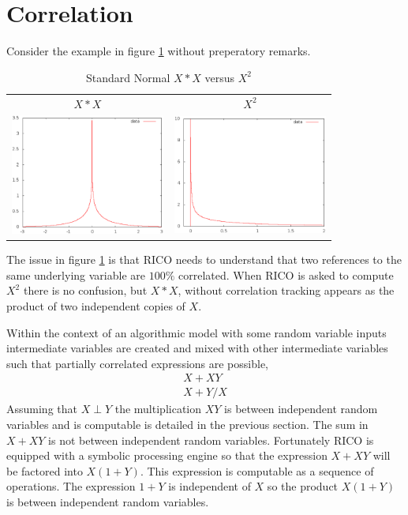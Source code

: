 \section{Correlation}
Consider the example in figure \ref{fig:Product_Power} without preperatory remarks.
\begin{table}
\begin{center}
\begin{tabular}{cc}
$X*X$ & $X^2$\\
\includegraphics[width=2in]{Images/N01xN01.eps} &
\includegraphics[width=2in]{Images/N01xx2.eps} \\
\end{tabular}
\end{center}
\caption[Standard Normal $X*X$ versus $X^2$]
        {Standard Normal $X*X$ versus $X^2$}
\label{fig:Product_Power}
\end{table}

The issue in figure \ref{fig:Product_Power} is that RICO needs to understand that two references to the same underlying variable are $100\%$ correlated. When RICO is asked to compute $X^2$ there is no confusion, but $X*X$, without correlation tracking appears as the product of two independent copies of $X$.

Within the context of an algorithmic model with some random variable inputs intermediate variables are created and mixed with other intermediate variables such that partially correlated expressions are possible,
\begin{align*}
X + XY\\
X + Y/X
\end{align*}
Assuming that $X \perp Y$ the multiplication $XY$ is between independent random variables and is computable is detailed in the previous section. The sum in $X + XY$ is not between independent random variables. Fortunately RICO is equipped with a symbolic processing engine so that the expression $X+XY$ will be factored into $X(1+Y)$. This expression is computable as a sequence of operations. The expression $1+Y$ is independent of $X$ so the product $X(1+Y)$ is between independent random variables. 

